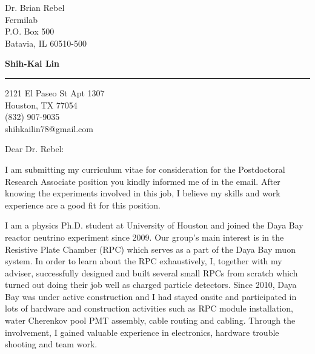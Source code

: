 \documentclass{letter} %
\begin{document}
\signature{Shih-Kai Lin}           %
\longindentation=0pt                       %
\let\raggedleft\raggedright                %
 
 
\begin{letter}{Dr. Brian Rebel \\
Fermilab \\
P.O. Box 500 \\
Batavia, IL 60510-500}

\begin{center}
{\large\bf Shih-Kai Lin} 
\end{center}
\medskip\hrule height 1pt
\begin{center}
{2121 El Paseo St Apt 1307 \\   Houston, TX 77054 \\ (832) 907-9035 \\ shihkailin78@gmail.com} 
\end{center} \vfill %
 
 
\opening{Dear Dr. Rebel:} 
 
\noindent %
I am submitting my curriculum vitae for consideration for the Postdoctoral Research Associate position you kindly informed me of in the email. After knowing the experiments involved in this job, I believe my skills and work experience are a good fit for this position.
 
\noindent %
I am a physics Ph.D. student at University of Houston and joined the Daya Bay reactor neutrino experiment since 2009. Our group's main interest is in the Resistive Plate Chamber (RPC) which serves as a part of the Daya Bay muon system. In order to learn about the RPC exhaustively, I, together with my adviser, successfully designed and built several small RPCs from scratch which turned out doing their job well as charged particle detectors. Since 2010, Daya Bay was under active construction and I had stayed onsite and participated in lots of hardware and construction activities such as RPC module installation, water Cherenkov pool PMT assembly, cable routing and cabling. Through the involvement, I gained valuable experience in electronics, hardware trouble shooting and team work.


\end{letter}
\end{document}
